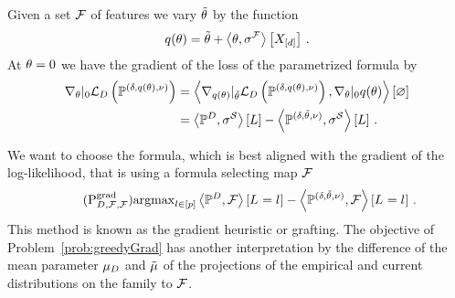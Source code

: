 Given a set $\mathcal{F}$ of features we vary $\tilde{\theta}$ by the function
\begin{align*}
    q(\theta) = \tilde{\theta} + \left\langle \theta,\sigma^{\mathcal{F}}\right\rangle \left[ X_{[d]} \right] \, .
\end{align*}
At $\theta=0$ we have the gradient of the loss of the parametrized formula by
\begin{align*}
    \nabla_{\theta}|_{0}
    \mathcal{L}_{D}\left(\mathbb{P}^{(\delta,q(\theta),\nu)}\right)
    &= \left\langle 
        \nabla_{q(\theta)}|_{\tilde{\theta}}  \mathcal{L}_{D}\left(\mathbb{P}^{(\delta,q(\theta),\nu)}\right),
        \nabla_{\theta}|_{0}  q(\theta)
    \right\rangle \left[ \varnothing \right]  \\
    &= \left\langle \mathbb{P}^{D},\sigma^{\mathcal{S}}\right\rangle \left[ L \right] -   \left\langle \mathbb{P}^{(\delta, \tilde{\theta}, \nu)},\sigma^{\mathcal{S}}\right\rangle \left[ L \right] \, .
\end{align*}


We want to choose the formula, which is best aligned with the gradient of the log-likelihood, that is using a formula selecting map $\mathcal{F}$
\begin{align}
    \label{prob:greedyGrad}\tag{$\mathrm{P}^{\mathrm{grad}}_{\datamap,\formulaset,\fselectionmap}$}
    \argmax_{\selindex\in[\seldim]} \contractionof{\empdistribution,\fselectionmap}{\indexedselvariable}
    - \contractionof{\expdistof{(\naivestat, \naivecanparam, \basemeasure)},\fselectionmap}{\indexedselvariable} \, .
\end{align}
This method is known as the gradient heuristic or grafting.
The objective of Problem~\eqref{prob:greedyGrad} has another interpretation by the difference of the mean parameter $\mu_{D}$ and $\tilde{\mu}$ of the projections of the empirical and current distributions on the family to $\mathcal{F}$. %

